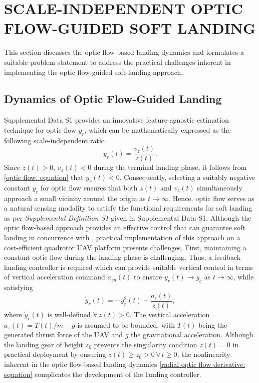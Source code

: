 \documentclass{IEEEtaes}
\begin{document}
\section{SCALE-INDEPENDENT OPTIC FLOW-GUIDED SOFT LANDING} \label{background: section}
This section discusses the optic flow-based landing dynamics and formulates a suitable problem statement to address the practical challenges inherent in implementing the optic flow-guided soft landing approach.

\subsection{Dynamics of Optic Flow-Guided Landing} \label{optic flow: section}
Supplemental Data S1 provides an innovative feature-agnostic estimation technique for optic flow $y_r$, which can be mathematically expressed as the following scale-independent ratio
\begin{equation}
\label{optic flow: equation}
    y_r(t) = \frac{v_z(t)}{z(t)}.
\end{equation}
Since $z(t) > 0$, $v_z(t) < 0$ during the terminal landing phase, it follows from \eqref{optic flow: equation} that $y_r(t) < 0$.
Consequently, selecting a suitably negative constant $y_c$ for optic flow ensures that both $z(t)$ and $v_z(t)$ simultaneously approach a small vicinity around the origin as $t \to \infty$.
Hence, optic flow serves as a natural sensing modality to satisfy the functional requirements for soft landing as per \textit{Supplemental Definition S1} given in Supplemental Data S1.
Although the optic flow-based approach provides an effective control that can guarantee soft landing in concurrence with \cite{baird2013}, practical implementation of this approach on a cost-efficient quadrotor UAV platform presents challenges. 
First, maintaining a constant optic flow during the landing phase is challenging.
Thus, a feedback landing controller is required which can provide suitable vertical control in terms of vertical acceleration command $a_{zu}(t)$ to ensure $y_r(t) \to y_c$ as $t \to \infty$, while satisfying
\begin{equation} \label{radial optic flow derivative: equation}
\dot{y}_r(t) = -y_r^2(t) + \frac{a_z(t)}{z(t)},
\end{equation}
where $\dot{y}_r(t)$ is well-defined $\forall \, z(t)>0$. The vertical acceleration $a_z(t)=T(t)/m-g$ is assumed to be bounded, with $T(t)$ being the generated thrust force of the UAV and $g$ the gravitational acceleration.
Although the landing gear of height $z_0$ prevents the singularity condition $z(t) = 0$ in practical deployment by ensuring $z(t) \geq z_0 > 0 \, \forall \, t\geq 0$, the nonlinearity inherent in the optic flow-based landing dynamics \eqref{radial optic flow derivative: equation} complicates the development of the landing controller.
\end{document}
